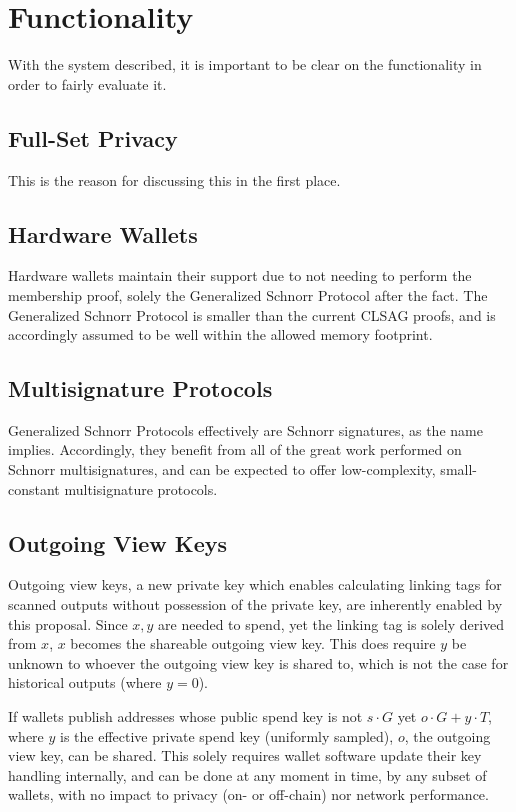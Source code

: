 \documentclass[]{article}
\begin{document}
\section{Functionality}

With the system described, it is important to be clear on the functionality in order to fairly evaluate it.

\subsection{Full-Set Privacy}

This is the reason for discussing this in the first place.

\subsection{Hardware Wallets}

Hardware wallets maintain their support due to not needing to perform the membership proof, solely the Generalized Schnorr Protocol after the fact. The Generalized Schnorr Protocol is smaller than the current CLSAG proofs, and is accordingly assumed to be well within the allowed memory footprint.

\subsection{Multisignature Protocols}

Generalized Schnorr Protocols effectively are Schnorr signatures, as the name implies. Accordingly, they benefit from all of the great work performed on Schnorr multisignatures, and can be expected to offer low-complexity, small-constant multisignature protocols.

\subsection{Outgoing View Keys}

Outgoing view keys, a new private key which enables calculating linking tags for scanned outputs without possession of the private key, are inherently enabled by this proposal. Since $x, y$ are needed to spend, yet the linking tag is solely derived from $x$, $x$ becomes the shareable outgoing view key. This does require $y$ be unknown to whoever the outgoing view key is shared to, which is not the case for historical outputs (where $y = 0$).

If wallets publish addresses whose public spend key is not $s \cdot G$ yet $o \cdot G + y \cdot T$, where $y$ is the effective private spend key (uniformly sampled), $o$, the outgoing view key, can be shared. This solely requires wallet software update their key handling internally, and can be done at any moment in time, by any subset of wallets, with no impact to privacy (on- or off-chain) nor network performance.
\end{document}
